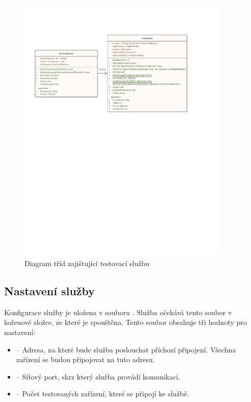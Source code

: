 \begin{figure}[H]
    \centering 
    \includegraphics[width=0.90\textwidth]{assets/img/class_diagram/service.pdf}
    \caption{Diagram tříd zajištující testovací službu}
    \label{fig:test_service}
\end{figure}

\subsection{Nastavení služby}\label{sec:settings}

Konfigurace služby je uložena v souboru . Služba očekává tento soubor v kořenové složce, ze které je spouštěna. Tento soubor obsahuje tři hodnoty pro nastavení:

\begin{itemize}
    \item {} -- Adresa, na které bude služba poslouchat příchozí připojení. Všechna zařízení se budou připojovat na tuto adresu.
    \item {} -- Síťový port, skrz který služba provádí komunikaci.
    \item {} -- Počet testovaných zařízení, které se připojí ke službě.   
\end{itemize}

